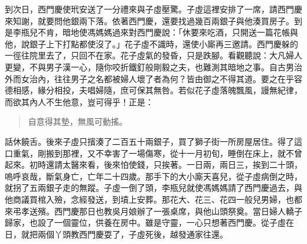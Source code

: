到次日，西門慶使玳安送了一分禮來與子虛壓驚。子虛這裡安排了一席，請西門慶來知謝，就要問他銀兩下落。依著西門慶，還要找過幾百兩銀子與他湊買房子。到是李瓶兒不肯，暗地使馮媽媽過來對西門慶說：「休要來吃酒，只開送一篇花帳與他，說銀子上下打點都使沒了。」花子虛不識時，還使小廝再三邀請。西門慶躲的一徑往院里去了，只回不在家。花子虛氣的發昏，只是跌腳。看觀聽說：大凡婦人更變，不與男子漢一心，隨你咬折鐵釘般剛毅之夫，也難測其暗地之事。自古男治外而女治內，往往男子之名都被婦人壞了者為何？皆由御之不得其道。要之在乎容德相感，緣分相投，夫唱婦隨，庶可保其無咎。若似花子虛落魄飄風，謾無紀律，而欲其內人不生他意，豈可得乎！正是：
\begin{quote}
自意得其墊，無風可動搖。
\end{quote}

話休饒舌。後來子虛只擯湊了二百五十兩銀子，買了獅子街一所房屋居住。得了這口重氣，剛搬到那裡，又不幸害了一場傷寒，從十一月初旬，睡倒在床上，就不曾起來。初時還請太醫來看，後來怕使錢，只挨著。一日兩，兩日三，挨到二十頭，嗚呼哀哉，斷氣身亡，亡年二十四歲。那手下的大小廝天喜兒，從子虛病倒之時，就拐了五兩銀子走的無蹤。子虛一倒了頭，李瓶兒就使馮媽媽請了西門慶過去，與他商議買棺入殮，念經發送，到墳上安葬。那花大、花三、花四一般兒男婦，也都來弔孝送殯。西門慶那日也教吳月娘辦了一張桌席，與他山頭祭奠。當日婦人轎子歸家，也設了一個靈位，供養在房中。雖是守靈，一心只想著西門慶。從子虛在日，就把兩個丫頭教西門慶耍了，子虛死後，越發通家往還。

